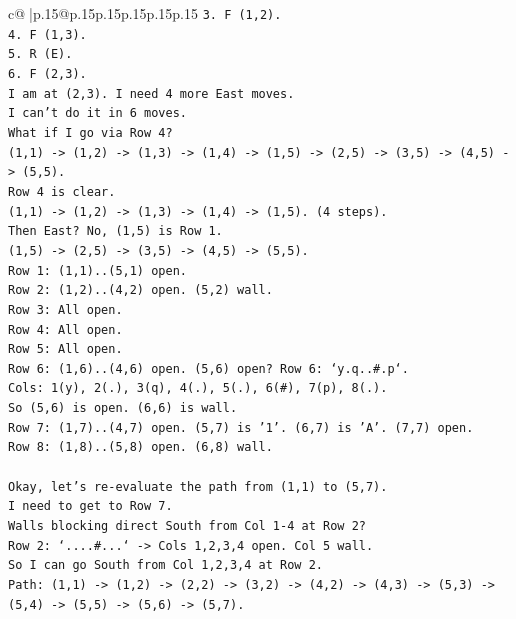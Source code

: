 \documentclass{article}
\begin{document}
{\begin{supertabular}{c@{$\;$}|p{.15\linewidth}@{}p{.15\linewidth}p{.15\linewidth}p{.15\linewidth}p{.15\linewidth}p{.15\linewidth}}
{{{\texttt{3. F (1,2).} \\
\texttt{4. F (1,3).} \\
\texttt{5. R (E).} \\
\texttt{6. F (2,3).} \\
\texttt{I am at (2,3). I need 4 more East moves.} \\
\texttt{I can't do it in 6 moves.} \\
\texttt{What if I go via Row 4?} \\
\texttt{(1,1) {-}> (1,2) {-}> (1,3) {-}> (1,4) {-}> (1,5) {-}> (2,5) {-}> (3,5) {-}> (4,5) {-}> (5,5).} \\
\texttt{Row 4 is clear.} \\
\texttt{(1,1) {-}> (1,2) {-}> (1,3) {-}> (1,4) {-}> (1,5). (4 steps).} \\
\texttt{Then East? No, (1,5) is Row 1.} \\
\texttt{(1,5) {-}> (2,5) {-}> (3,5) {-}> (4,5) {-}> (5,5).} \\
\texttt{Row 1: (1,1)..(5,1) open.} \\
\texttt{Row 2: (1,2)..(4,2) open. (5,2) wall.} \\
\texttt{Row 3: All open.} \\
\texttt{Row 4: All open.} \\
\texttt{Row 5: All open.} \\
\texttt{Row 6: (1,6)..(4,6) open. (5,6) open? Row 6: `y.q..\#.p`.} \\
\texttt{Cols: 1(y), 2(.), 3(q), 4(.), 5(.), 6(\#), 7(p), 8(.).} \\
\texttt{So (5,6) is open. (6,6) is wall.} \\
\texttt{Row 7: (1,7)..(4,7) open. (5,7) is '1'. (6,7) is 'A'. (7,7) open.} \\
\texttt{Row 8: (1,8)..(5,8) open. (6,8) wall.} \\
\\ 
\texttt{Okay, let's re{-}evaluate the path from (1,1) to (5,7).} \\
\texttt{I need to get to Row 7.} \\
\texttt{Walls blocking direct South from Col 1{-}4 at Row 2?} \\
\texttt{Row 2: `....\#...` {-}> Cols 1,2,3,4 open. Col 5 wall.} \\
\texttt{So I can go South from Col 1,2,3,4 at Row 2.} \\
\texttt{Path: (1,1) {-}> (1,2) {-}> (2,2) {-}> (3,2) {-}> (4,2) {-}> (4,3) {-}> (5,3) {-}> (5,4) {-}> (5,5) {-}> (5,6) {-}> (5,7).} \\
}}}
\end{supertabular}}
\end{document}
